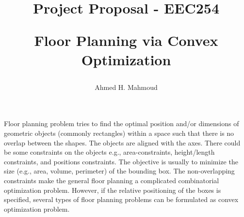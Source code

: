 \documentclass[12pt] {article}
\begin{document}

\title{
Project Proposal -  EEC254 \\
\begin{large}
Floor Planning via Convex Optimization
\end{large}
}
\author{Ahmed H. Mahmoud}
\date{}
\maketitle



Floor planning problem tries to find the optimal position and/or dimensions of geometric objects (commonly rectangles) within a space such that there is no overlap between the shapes. The objects are aligned with the axes. There could be some constraints on the objects e.g., area-constraints, height/length constraints, and positions constraints. The objective is usually to minimize the size (e.g., area, volume, perimeter) of the bounding box. The non-overlapping constraints make the general floor planning a complicated combinatorial optimization problem. However, if the relative positioning of the boxes is specified, several types of floor planning problems can be formulated as convex optimization problem. 
\end{document}
